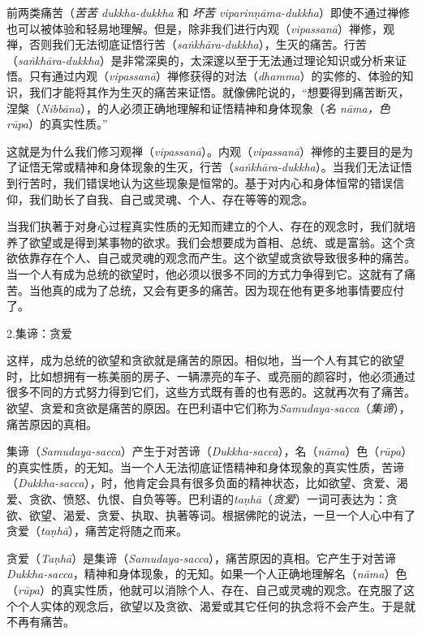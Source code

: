 前两类痛苦（{\it 苦苦 dukkha-dukkha} 和 {\it 坏苦 viparin\d n\=ama-dukkha}）即使不通过禅修也可以被体验和轻易地理解。但是，除非我们进行内观（{\it vipassan\=a}）禅修，观禅，否则我们无法彻底证悟行苦（{\it sa\.nkh\=ara-dukkha}），生灭的痛苦。行苦（{\it sa\.nkh\=ara-dukkha}）是非常深奥的，太深邃以至于无法通过理论知识或分析来证悟。只有通过内观（{\it vipassan\=a}）禅修获得的对法（{\it dhamma}）的实修的、体验的知识，我们才能将其作为生灭的痛苦来证悟。就像佛陀说的，“想要得到痛苦断灭，涅槃（{\it Nibb\=ana}），的人必须正确地理解和证悟精神和身体现象（{\it 名 n\=ama，色 r\=upa}）的真实性质。”

这就是为什么我们修习观禅（{\it vipassan\=a}）。内观（{\it vipassan\=a}）禅修的主要目的是为了证悟无常或精神和身体现象的生灭，行苦（{\it sa\.nkh\=ara-dukkha}）。当我们无法证悟到行苦时，我们错误地认为这些现象是恒常的。基于对内心\1和身体恒常的错误信仰，我们助长了自我、自己或灵魂、个人、存在等等的观念。

当我们执著于对身心过程真实性质的无知而建立的个人、存在的观念时，我们就培养了欲望或是得到某事物的欲求。我们会想要成为首相、总统、或是富翁。这个贪欲依靠存在个人、自己或灵魂的观念而产生。这个欲望或贪欲导致很多种的痛苦。当一个人有成为总统的欲望时，他必须以很多不同的方式力争得到它。这就有了痛苦。当他真的成为了总统，又会有更多的痛苦。因为现在他有更多地事情要应付了。

\sssubsectnon 2.集谛：贪爱

这样，成为总统的欲望和贪欲就是痛苦的原因。相似地，当一个人有其它的欲望时，比如想拥有一栋美丽的房子、一辆漂亮的车子、或亮丽的颜容时，他必须通过很多不同的方式努力得到它们，这些方式既有善的也有恶的。这就再次有了痛苦。欲望、贪爱和贪欲是痛苦的原因。在巴利语中它们称为{\it Samudaya-sacca}（{\it 集谛}），痛苦原因的真相。

集谛（{\it Samudaya-sacca}）产生于对苦谛（{\it Dukkha-sacca}），名（{\it n\=ama}）色（{\it r\=upa}）的真实性质，的无知。当一个人无法彻底证悟精神和身体现象的真实性质，苦谛（{\it Dukkha-sacca}），时，他肯定会具有很多负面的精神状态，比如欲望、贪爱、渴爱、贪欲、愤怒、仇恨、自负等等。巴利语的{\it ta\d nh\=a}（{\it 贪爱}）一词可表达为：贪欲、欲望、渴爱、贪爱、执取、执著等词。根据佛陀的说法，一旦一个人\1心中有了贪爱（{\it ta\d nh\=a}），痛苦定将随之而来。

贪爱（{\it Ta\d nh\=a}）是集谛（{\it Samudaya-sacca}），痛苦原因的真相。它产生于对苦谛{\it Dukkha-sacca}，精神和身体现象，的无知。如果一个人正确地理解名（{\it n\=ama}）色（{\it r\=upa}）的真实性质，他就可以消除个人、存在、自己或灵魂的观念。在克服了这个个人实体的观念后，欲望以及贪欲、渴爱或其它任何的执念将不会产生。于是就不再有痛苦。

